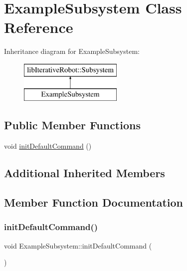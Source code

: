\hypertarget{class_example_subsystem}{}\section{Example\+Subsystem Class Reference}
\label{class_example_subsystem}
Inheritance diagram for Example\+Subsystem\+:\begin{figure}[H]
\begin{center}
\leavevmode
\includegraphics[height=2.000000cm]{class_example_subsystem}
\end{center}
\end{figure}
\subsection*{Public Member Functions}
\begin{DoxyCompactItemize}
\item 
void \mbox{\hyperlink{class_example_subsystem_a147ea127ab9c71f9d86e4f5e5a4e9d5a}{init\+Default\+Command}} ()
\end{DoxyCompactItemize}
\subsection*{Additional Inherited Members}


\subsection{Member Function Documentation}
\mbox{\label{class_example_subsystem_a147ea127ab9c71f9d86e4f5e5a4e9d5a}} 
\subsubsection{\texorpdfstring{initDefaultCommand()}{initDefaultCommand()}}
{\footnotesize\ttfamily void Example\+Subsystem\+::init\+Default\+Command (\begin{DoxyParamCaption}{ }\end{DoxyParamCaption})\hspace{0.3cm}{\ttfamily [virtual]}}

